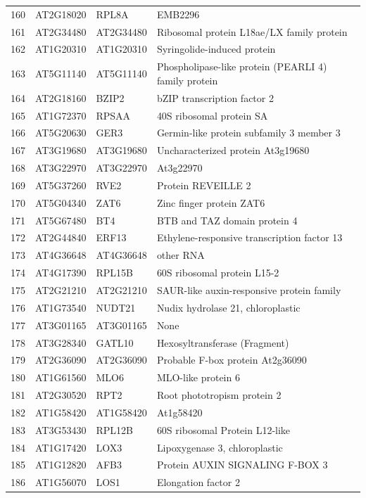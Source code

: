 \documentclass[11pt]{article}
\begin{document}
\begin{center}
\begin{tabular}{rlll}
160 & AT2G18020 & RPL8A & EMB2296\\
161 & AT2G34480 & AT2G34480 & Ribosomal protein L18ae/LX family protein\\
162 & AT1G20310 & AT1G20310 & Syringolide-induced protein\\
163 & AT5G11140 & AT5G11140 & Phospholipase-like protein (PEARLI 4) family protein\\
164 & AT2G18160 & BZIP2 & bZIP transcription factor 2\\
165 & AT1G72370 & RPSAA & 40S ribosomal protein SA\\
166 & AT5G20630 & GER3 & Germin-like protein subfamily 3 member 3\\
167 & AT3G19680 & AT3G19680 & Uncharacterized protein At3g19680\\
168 & AT3G22970 & AT3G22970 & At3g22970\\
169 & AT5G37260 & RVE2 & Protein REVEILLE 2\\
170 & AT5G04340 & ZAT6 & Zinc finger protein ZAT6\\
171 & AT5G67480 & BT4 & BTB and TAZ domain protein 4\\
172 & AT2G44840 & ERF13 & Ethylene-responsive transcription factor 13\\
173 & AT4G36648 & AT4G36648 & other RNA\\
174 & AT4G17390 & RPL15B & 60S ribosomal protein L15-2\\
175 & AT2G21210 & AT2G21210 & SAUR-like auxin-responsive protein family\\
176 & AT1G73540 & NUDT21 & Nudix hydrolase 21, chloroplastic\\
177 & AT3G01165 & AT3G01165 & None\\
178 & AT3G28340 & GATL10 & Hexosyltransferase (Fragment)\\
179 & AT2G36090 & AT2G36090 & Probable F-box protein At2g36090\\
180 & AT1G61560 & MLO6 & MLO-like protein 6\\
181 & AT2G30520 & RPT2 & Root phototropism protein 2\\
182 & AT1G58420 & AT1G58420 & At1g58420\\
183 & AT3G53430 & RPL12B & 60S ribosomal Protein L12-like\\
184 & AT1G17420 & LOX3 & Lipoxygenase 3, chloroplastic\\
185 & AT1G12820 & AFB3 & Protein AUXIN SIGNALING F-BOX 3\\
186 & AT1G56070 & LOS1 & Elongation factor 2\\

\end{tabular}
\end{center}
\end{document}
